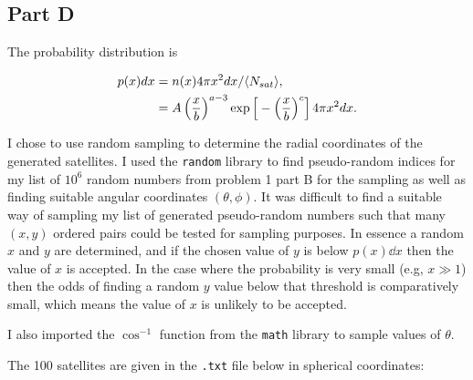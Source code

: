 \subsection{Part D}

The probability distribution is

\begin{align}
p(x) dx &= n(x) 4\pi x^{2} dx / \langle N_{sat} \rangle, \\
&= A \, \Big({x\over b}\Big)^{a-3} \exp\Big[-\Big({x\over b}\Big)^{c}\Big] \, 4\pi x^{2} dx.
\end{align}

I chose to use random sampling to determine the radial coordinates of the generated satellites. I used the \texttt{random} library to find pseudo-random indices for my list of $10^{6}$ random numbers from problem 1 part B for the sampling as well as finding suitable angular coordinates $(\theta, \phi)$. It was difficult to find a suitable way of sampling my list of generated pseudo-random numbers such that many $(x,y)$ ordered pairs could be tested for sampling purposes. In essence a random $x$ and $y$ are determined, and if the chosen value of $y$ is below $p(x) \dd x$ then the value of $x$ is accepted. In the case where the probability is very small (e.g, $x \gg 1$) then the odds of finding a random $y$ value below that threshold is comparatively small, which means the value of $x$ is unlikely to be accepted. 

I also imported the $\cos^{-1}$ function from the \texttt{math} library to sample values of $\theta$.



The 100 satellites are given in the \texttt{.txt} file below in spherical coordinates:


